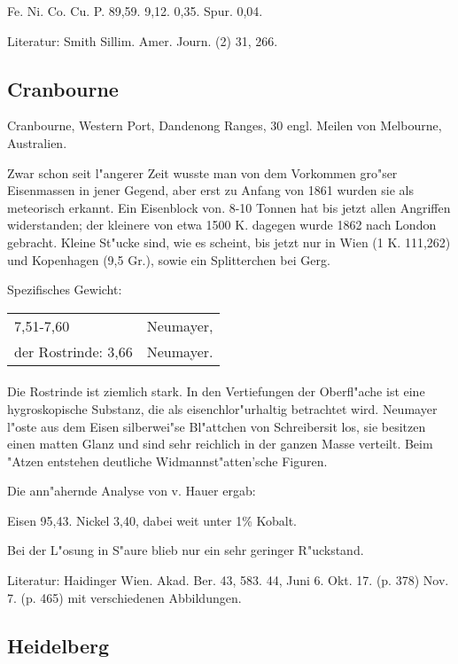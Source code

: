 \documentclass[a4paper, 11pt, oneside]{article}
\begin{document}
Fe. Ni. Co. Cu. P.  
89,59. 9,12. 0,35. Spur. 0,04.

Literatur: Smith Sillim. Amer. Journ. (2) 31, 266.

\subsection{Cranbourne}

Cranbourne, Western Port, Dandenong Ranges, 30 engl. Meilen von Melbourne, Australien.

Zwar schon seit l"angerer Zeit wusste man von dem Vorkommen gro"ser Eisenmassen in jener Gegend, aber erst zu Anfang von 1861 wurden sie als meteorisch erkannt. Ein Eisenblock von. 8-10 Tonnen hat bis jetzt allen Angriffen widerstanden; der kleinere von etwa 1500 K. dagegen wurde 1862 nach London gebracht. Kleine St"ucke sind, wie es scheint, bis jetzt nur in Wien (1 K. 111,262) und Kopenhagen (9,5 Gr.), sowie ein Splitterchen bei Gerg.

Spezifisches Gewicht: 
\begin{table}[!ht]
    \centering
    \begin{tabular}{l l}
        7,51-7,60 & Neumayer,\\
        der Rostrinde: 3,66 & Neumayer.
    \end{tabular}
\end{table}
\paragraph{}
Die Rostrinde ist ziemlich stark. In den Vertiefungen der Oberfl"ache ist eine hygroskopische Substanz, die als eisenchlor"urhaltig betrachtet wird. Neumayer l"oste aus dem Eisen silberwei"se Bl"attchen von Schreibersit los, sie besitzen einen matten Glanz und sind sehr reichlich in der ganzen Masse verteilt. Beim "Atzen entstehen deutliche Widmannst"atten'sche Figuren.

Die ann"ahernde Analyse von v. Hauer ergab:

Eisen 95,43.
Nickel 3,40, dabei weit unter 1\% Kobalt.

Bei der L"osung in S"aure blieb nur ein sehr geringer R"uckstand.

Literatur: Haidinger Wien. Akad. Ber. 43, 583. 44, Juni 6. Okt. 17. (p. 378) Nov. 7. (p. 465) mit verschiedenen Abbildungen.

\subsection{Heidelberg}
\end{document}
